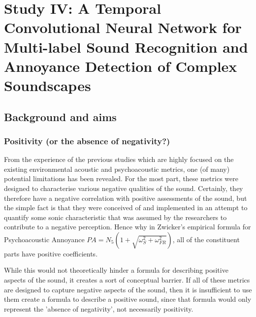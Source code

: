 \documentclass[oneside,fontsize=13pt,titlepage]{scrbook}
\begin{document}
% 




%  



\newpage
\chapter[Study IV: DeLTA]{Study IV: A Temporal Convolutional Neural Network for Multi-label Sound Recognition and Annoyance Detection of Complex Soundscapes}

\section*{Background and aims}

 \subsection*{Positivity (or the absence of negativity?)}
       From the experience of the previous studies which are highly focused on the existing environmental acoustic and psychoacoustic metrics, one (of many) potential limitations has been revealed. For the most part, these metrics were designed to characterise various negative qualities of the sound. Certainly, they therefore have a negative correlation with positive assessments of the sound, but the simple fact is that they were conceived of and implemented in an attempt to quantify some sonic characteristic that was assumed by the researchers to contribute to a negative perception. Hence why in Zwicker's empirical formula for Psychoacoustic Annoyance \citep{PsychoacousticsfactsmodelsZwicker} $PA = N_5 (1 + \sqrt{\omega^2_S + \omega^2_{FR}})$, all of the constituent parts have positive coefficients.

       While this would not theoretically hinder a formula for describing positive aspects of the sound, it creates a sort of conceptual barrier. If all of these metrics are designed to capture negative aspects of the sound, then it is insufficient to use them create a formula to describe a positive sound, since that formula would only represent the 'absence of negativity', not necessarily positivity.
\end{document}
